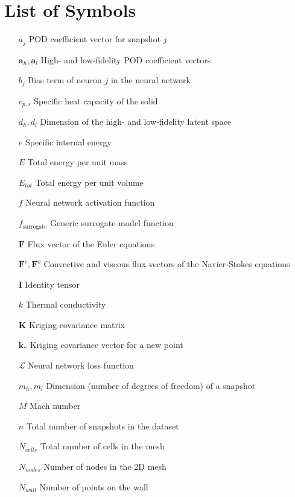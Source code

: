 
\chapter*{List of Symbols}

\begin{itemize}
\item[$a_j$] POD coefficient vector for snapshot $j$
\item[$\mathbf{a}_h, \mathbf{a}_l$] High- and low-fidelity POD coefficient vectors
\item[$b_j$] Bias term of neuron $j$ in the neural network
\item[$c_{p,s}$] Specific heat capacity of the solid
\item[$d_h, d_l$] Dimension of the high- and low-fidelity latent space
\item[$e$] Specific internal energy
\item[$E$] Total energy per unit mass
\item[$E_{tot}$] Total energy per unit volume
\item[$f$] Neural network activation function
\item[$f_{\text{surrogate}}$] Generic surrogate model function
\item[$\mathbf{F}$] Flux vector of the Euler equations
\item[$\mathbf{F}^c, \mathbf{F}^v$] Convective and viscous flux vectors of the Navier-Stokes equations
\item[$\mathbf{I}$] Identity tensor
\item[$k$] Thermal conductivity
\item[$\mathbf{K}$] Kriging covariance matrix
\item[$\mathbf{k}_*$] Kriging covariance vector for a new point
\item[$\mathcal{L}$] Neural network loss function
\item[$m_h, m_l$] Dimension (number of degrees of freedom) of a snapshot
\item[$M$] Mach number
\item[$n$] Total number of snapshots in the dataset
\item[$N_{cells}$] Total number of cells in the mesh
\item[$N_{nodes}$] Number of nodes in the 2D mesh
\item[$N_{wall}$] Number of points on the wall

\end{itemize}
